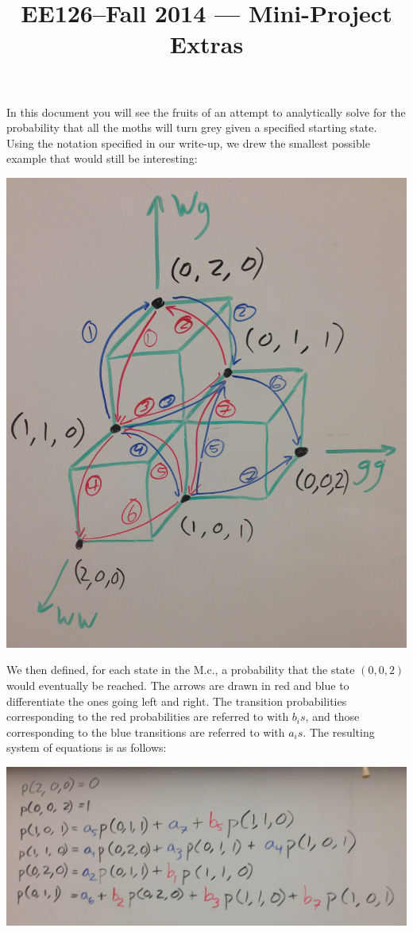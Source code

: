 \documentclass[11pt]{article}
\title{EE126--Fall 2014 --- Mini-Project Extras}
\author{\Names}
\begin{document}
\maketitle
In this document you will see the fruits of an attempt to analytically solve for the probability that all the moths will turn grey given a specified starting state. Using the notation specified in our write-up, we drew the smallest possible example that would still be interesting:
\begin{center}
\includegraphics[scale=0.1]{markov-chain}
\end{center} 

We then defined, for each state in the M.c., a probability that the state $(0,0,2)$ would eventually be reached. The arrows are drawn in red and blue to differentiate the ones going left and right. The transition probabilities corresponding to the red probabilities are referred to with $b_is$, and those corresponding to the blue transitions are referred to with $a_is$. The resulting system of equations is as follows: \newpage

\begin{center}
\includegraphics[scale=0.1]{equations}
\end{center}
\end{document}
